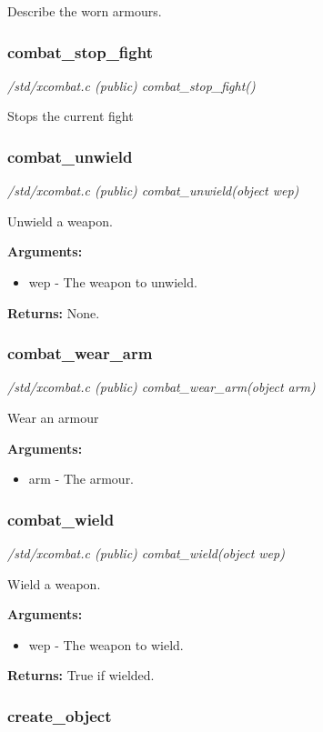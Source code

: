 Describe the worn armours.


\subsubsection{combat\_stop\_fight}

{\em /std/xcombat.c (public) combat\_stop\_fight()}

Stops the current fight


\subsubsection{combat\_unwield}

{\em /std/xcombat.c (public) combat\_unwield(object wep)}

Unwield a weapon.

{\bf Arguments:}
\begin{itemize}
\item     wep - The weapon to unwield.
\end{itemize}

{\bf Returns:}        None.


\subsubsection{combat\_wear\_arm}

{\em /std/xcombat.c (public) combat\_wear\_arm(object arm)}

Wear an armour

{\bf Arguments:}
\begin{itemize}
\item     arm - The armour.
\end{itemize}


\subsubsection{combat\_wield}

{\em /std/xcombat.c (public) combat\_wield(object wep)}

Wield a weapon.

{\bf Arguments:}
\begin{itemize}
\item     wep - The weapon to wield.
\end{itemize}

{\bf Returns:}        True if wielded.


\subsubsection{create\_object}

